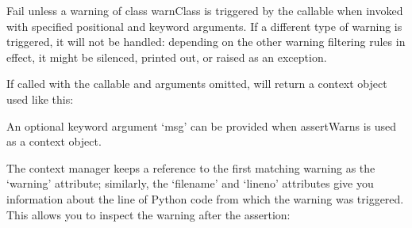 \documentclass[letterpaper,10pt,english]{sphinxmanual}
\begin{document}
\begin{fulllineitems}
\begin{fulllineitems}
\label{\detokenize{_autosummary/tests.test_unit.test_df:tests.test_unit.test_df.assertWarns}}
\pysigstartsignatures
{}
\pysigstopsignatures
\sphinxAtStartPar
Fail unless a warning of class warnClass is triggered
by the callable when invoked with specified positional and
keyword arguments.  If a different type of warning is
triggered, it will not be handled: depending on the other
warning filtering rules in effect, it might be silenced, printed
out, or raised as an exception.

\sphinxAtStartPar
If called with the callable and arguments omitted, will return a
context object used like this:

\begin{sphinxVerbatim}[commandchars=\\\{\}]
 
\end{sphinxVerbatim}

\sphinxAtStartPar
An optional keyword argument ‘msg’ can be provided when assertWarns
is used as a context object.

\sphinxAtStartPar
The context manager keeps a reference to the first matching
warning as the ‘warning’ attribute; similarly, the ‘filename’
and ‘lineno’ attributes give you information about the line
of Python code from which the warning was triggered.
This allows you to inspect the warning after the assertion:

\begin{sphinxVerbatim}[commandchars=\\\{\}]
   
  
 
\end{sphinxVerbatim}

\end{fulllineitems}


\end{fulllineitems}
\end{document}
